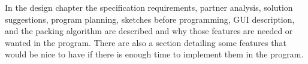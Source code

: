 In the design chapter the specification requirements, partner analysis, solution suggestions, program planning, sketches before programming, GUI description, and the packing algorithm are described and why those features are needed or wanted in the program. There are also a section detailing some features that would be nice to have if there is enough time to implement them in the program.